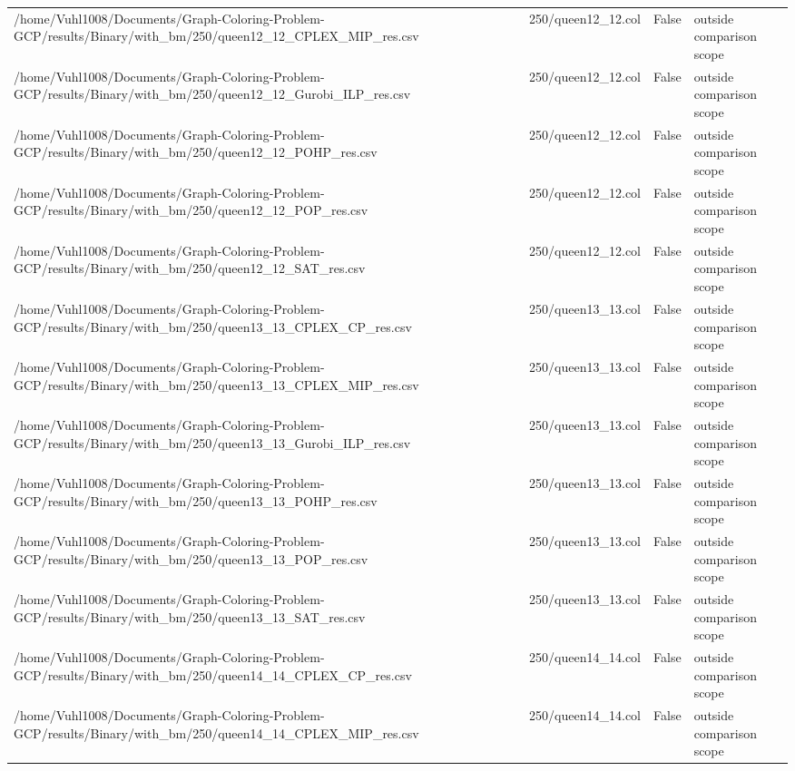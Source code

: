 \begin{table}[htbp]
\begin{tabular}{llll}
/home/Vuhl1008/Documents/Graph-Coloring-Problem-GCP/results/Binary/with\_bm/250/queen12\_12\_CPLEX\_MIP\_res.csv & 250/queen12\_12.col & False & outside comparison scope \\
/home/Vuhl1008/Documents/Graph-Coloring-Problem-GCP/results/Binary/with\_bm/250/queen12\_12\_Gurobi\_ILP\_res.csv & 250/queen12\_12.col & False & outside comparison scope \\
/home/Vuhl1008/Documents/Graph-Coloring-Problem-GCP/results/Binary/with\_bm/250/queen12\_12\_POHP\_res.csv & 250/queen12\_12.col & False & outside comparison scope \\
/home/Vuhl1008/Documents/Graph-Coloring-Problem-GCP/results/Binary/with\_bm/250/queen12\_12\_POP\_res.csv & 250/queen12\_12.col & False & outside comparison scope \\
/home/Vuhl1008/Documents/Graph-Coloring-Problem-GCP/results/Binary/with\_bm/250/queen12\_12\_SAT\_res.csv & 250/queen12\_12.col & False & outside comparison scope \\
/home/Vuhl1008/Documents/Graph-Coloring-Problem-GCP/results/Binary/with\_bm/250/queen13\_13\_CPLEX\_CP\_res.csv & 250/queen13\_13.col & False & outside comparison scope \\
/home/Vuhl1008/Documents/Graph-Coloring-Problem-GCP/results/Binary/with\_bm/250/queen13\_13\_CPLEX\_MIP\_res.csv & 250/queen13\_13.col & False & outside comparison scope \\
/home/Vuhl1008/Documents/Graph-Coloring-Problem-GCP/results/Binary/with\_bm/250/queen13\_13\_Gurobi\_ILP\_res.csv & 250/queen13\_13.col & False & outside comparison scope \\
/home/Vuhl1008/Documents/Graph-Coloring-Problem-GCP/results/Binary/with\_bm/250/queen13\_13\_POHP\_res.csv & 250/queen13\_13.col & False & outside comparison scope \\
/home/Vuhl1008/Documents/Graph-Coloring-Problem-GCP/results/Binary/with\_bm/250/queen13\_13\_POP\_res.csv & 250/queen13\_13.col & False & outside comparison scope \\
/home/Vuhl1008/Documents/Graph-Coloring-Problem-GCP/results/Binary/with\_bm/250/queen13\_13\_SAT\_res.csv & 250/queen13\_13.col & False & outside comparison scope \\
/home/Vuhl1008/Documents/Graph-Coloring-Problem-GCP/results/Binary/with\_bm/250/queen14\_14\_CPLEX\_CP\_res.csv & 250/queen14\_14.col & False & outside comparison scope \\
/home/Vuhl1008/Documents/Graph-Coloring-Problem-GCP/results/Binary/with\_bm/250/queen14\_14\_CPLEX\_MIP\_res.csv & 250/queen14\_14.col & False & outside comparison scope \\

\end{tabular}
\end{table}
